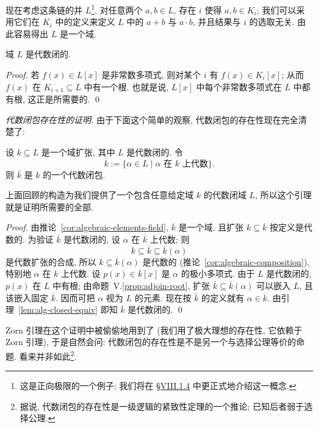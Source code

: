 现在考虑这条链的并 $L$\footnote{这是正向极限的一个例子; 我们将在 §\hyperref[subsec:limits-colimits]{VIII.1.4} 中更正式地介绍这一概念.}. 对任意两个 $a,b\in L$, 存在 $i$ 使得 $a,b\in K_i$; 我们可以采用它们在 $K_i$ 中的定义来定义 $L$ 中的 $a+b$ 与 $a\cdot b$, 并且结果与 $i$ 的选取无关. 由此容易得出 $L$ 是一个域.

\begin{claim}
\label{claim:L-alg-closed}
域 $L$ 是代数闭的.
\end{claim}

\begin{proof}
若 $f(x)\in L[x]$ 是非常数多项式, 则对某个 $i$ 有 $f(x)\in K_i[x]$; 从而 $f(x)$ 在 $K_{i+1}\subseteq L$ 中有一个根. 也就是说, $L[x]$ 中每个非常数多项式在 $L$ 中都有根, 这正是所需要的. \qed
\end{proof}

\noindent\emph{代数闭包存在性的证明.} 由于下面这个简单的观察, 代数闭包的存在性现在完全清楚了:

\begin{lemma}\label{lem:alg-elements-form-closure}
设 $k\subseteq L$ 是一个域扩张, 其中 $L$ 是代数闭的. 令
\[
\overline{k}:=\{\alpha\in L\mid \alpha\text{ 在 }k\text{ 上代数}\}.
\]
则 $\overline{k}$ 是 $k$ 的一个代数闭包.
\end{lemma}

上面回顾的构造为我们提供了一个包含任意给定域 $k$ 的代数闭域 $L$, 所以这个引理就是证明所需要的全部.

\begin{proof}
由推论~\ref{cor:algebraic-elements-field}, $\overline{k}$ 是一个域, 且扩张 $k\subseteq\overline{k}$ 按定义是代数的. 为验证 $\overline{k}$ 是代数闭的, 设 $\alpha$ 在 $\overline{k}$ 上代数; 则
\[
k\subseteq\overline{k}\subseteq\overline{k}(\alpha)
\]
是代数扩张的合成, 所以 $k\subseteq\overline{k}(\alpha)$ 是代数的 (推论~\ref{cor:algebraic-composition}), 特别地 $\alpha$ 在 $k$ 上代数. 设 $p(x)\in\overline{k}[x]$ 是 $\alpha$ 的极小多项式. 由于 $L$ 是代数闭的, $p(x)$ 在 $L$ 中有根; 由命题~V.\ref{prop:adjoin-root}, 扩张 $\overline{k}\subseteq\overline{k}(\alpha)$ 可以嵌入 $L$, 且该嵌入固定 $\overline{k}$. 因而可把 $\alpha$ 视为 $L$ 的元素. 现在按 $\overline{k}$ 的定义就有 $\alpha\in\overline{k}$. 由引理~\ref{lem:alg-closed-equiv} 即知 $\overline{k}$ 是代数闭的. \qed
\end{proof}

\begin{remark}\label{rmk:zorn-algebraic-closure}
Zorn 引理在这个证明中被偷偷地用到了 (我们用了极大理想的存在性, 它依赖于 Zorn 引理), 于是自然会问: 代数闭包的存在性是不是另一个与选择公理等价的命题. 看来并非如此\footnote{据说, 代数闭包的存在性是一级逻辑的紧致性定理的一个推论; 已知后者弱于选择公理.}.
\end{remark}

